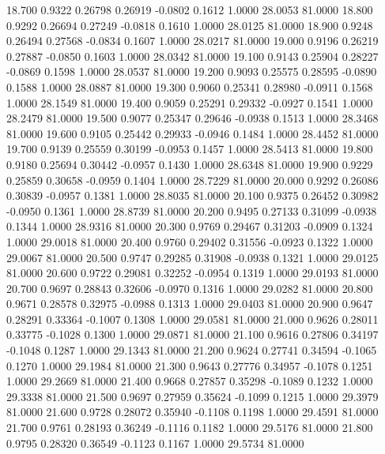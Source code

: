   18.700   0.9322   0.26798   0.26919  -0.0802   0.1612   1.0000  28.0053  81.0000
  18.800   0.9292   0.26694   0.27249  -0.0818   0.1610   1.0000  28.0125  81.0000
  18.900   0.9248   0.26494   0.27568  -0.0834   0.1607   1.0000  28.0217  81.0000
  19.000   0.9196   0.26219   0.27887  -0.0850   0.1603   1.0000  28.0342  81.0000
  19.100   0.9143   0.25904   0.28227  -0.0869   0.1598   1.0000  28.0537  81.0000
  19.200   0.9093   0.25575   0.28595  -0.0890   0.1588   1.0000  28.0887  81.0000
  19.300   0.9060   0.25341   0.28980  -0.0911   0.1568   1.0000  28.1549  81.0000
  19.400   0.9059   0.25291   0.29332  -0.0927   0.1541   1.0000  28.2479  81.0000
  19.500   0.9077   0.25347   0.29646  -0.0938   0.1513   1.0000  28.3468  81.0000
  19.600   0.9105   0.25442   0.29933  -0.0946   0.1484   1.0000  28.4452  81.0000
  19.700   0.9139   0.25559   0.30199  -0.0953   0.1457   1.0000  28.5413  81.0000
  19.800   0.9180   0.25694   0.30442  -0.0957   0.1430   1.0000  28.6348  81.0000
  19.900   0.9229   0.25859   0.30658  -0.0959   0.1404   1.0000  28.7229  81.0000
  20.000   0.9292   0.26086   0.30839  -0.0957   0.1381   1.0000  28.8035  81.0000
  20.100   0.9375   0.26452   0.30982  -0.0950   0.1361   1.0000  28.8739  81.0000
  20.200   0.9495   0.27133   0.31099  -0.0938   0.1344   1.0000  28.9316  81.0000
  20.300   0.9769   0.29467   0.31203  -0.0909   0.1324   1.0000  29.0018  81.0000
  20.400   0.9760   0.29402   0.31556  -0.0923   0.1322   1.0000  29.0067  81.0000
  20.500   0.9747   0.29285   0.31908  -0.0938   0.1321   1.0000  29.0125  81.0000
  20.600   0.9722   0.29081   0.32252  -0.0954   0.1319   1.0000  29.0193  81.0000
  20.700   0.9697   0.28843   0.32606  -0.0970   0.1316   1.0000  29.0282  81.0000
  20.800   0.9671   0.28578   0.32975  -0.0988   0.1313   1.0000  29.0403  81.0000
  20.900   0.9647   0.28291   0.33364  -0.1007   0.1308   1.0000  29.0581  81.0000
  21.000   0.9626   0.28011   0.33775  -0.1028   0.1300   1.0000  29.0871  81.0000
  21.100   0.9616   0.27806   0.34197  -0.1048   0.1287   1.0000  29.1343  81.0000
  21.200   0.9624   0.27741   0.34594  -0.1065   0.1270   1.0000  29.1984  81.0000
  21.300   0.9643   0.27776   0.34957  -0.1078   0.1251   1.0000  29.2669  81.0000
  21.400   0.9668   0.27857   0.35298  -0.1089   0.1232   1.0000  29.3338  81.0000
  21.500   0.9697   0.27959   0.35624  -0.1099   0.1215   1.0000  29.3979  81.0000
  21.600   0.9728   0.28072   0.35940  -0.1108   0.1198   1.0000  29.4591  81.0000
  21.700   0.9761   0.28193   0.36249  -0.1116   0.1182   1.0000  29.5176  81.0000
  21.800   0.9795   0.28320   0.36549  -0.1123   0.1167   1.0000  29.5734  81.0000
